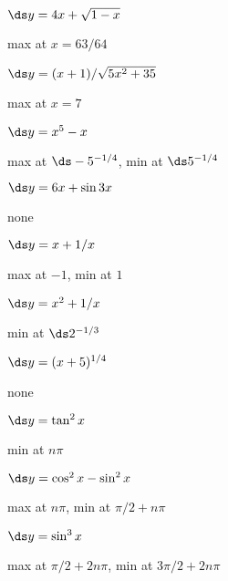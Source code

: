 \begin{exercises}
\begin{exercise} $\ds y = 4x+\sqrt{1-x}$
\begin{answer} max at $x=63/64$
\end{answer}\end{exercise}

\begin{exercise} $\ds y = (x+1)/\sqrt{5x^2 + 35}$
\begin{answer} max at $x=7$
\end{answer}\end{exercise}

\begin{exercise} $\ds y= x^5 - x$
\begin{answer} max at $\ds -5^{-1/4}$, min at $\ds 5^{-1/4}$
\end{answer}\end{exercise}

\begin{exercise} $\ds y = 6x +\sin 3x$
\begin{answer} none
\end{answer}\end{exercise}

\begin{exercise} $\ds y = x+ 1/x$
\begin{answer} max at $-1$, min at $1$
\end{answer}\end{exercise}

\begin{exercise} $\ds y = x^2+ 1/x$
\begin{answer} min at $\ds 2^{-1/3}$
\end{answer}\end{exercise}

\begin{exercise} $\ds y = (x+5)^{1/4}$
\begin{answer} none
\end{answer}\end{exercise}

\begin{exercise} $\ds y = \tan^2 x$
\begin{answer} min at $n\pi$
\end{answer}\end{exercise}

\begin{exercise} $\ds y =\cos^2 x - \sin^2 x$
\begin{answer} max at $n\pi$, min at $\pi/2+n\pi$
\end{answer}\end{exercise}

\begin{exercise} $\ds y = \sin^3 x$
\begin{answer} max at $\pi/2+2n\pi$, min at $3\pi/2+2n\pi$
\end{answer}\end{exercise}

\endtwocol
\end{exercises}

